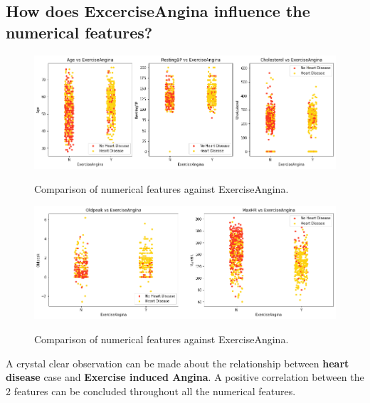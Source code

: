 \subsection{How does ExcerciseAngina influence the numerical features?}
\begin{figure}[!htpb]
    \centering
    \includegraphics[width=0.7\linewidth]{Figures/Outputs/exer-ang.png}
    \label{Comparison between numerical features against ExerciseAngina}
    \caption{Comparison of numerical features against ExerciseAngina.}
\end{figure}
\begin{figure}[!htpb]
    \centering
    \includegraphics[width=0.7\linewidth]{Figures/Outputs/exer-ang2.png}
    \label{Comparison between numerical features against ExerciseAngina}
    \caption{Comparison of numerical features against ExerciseAngina.}
\end{figure}
A crystal clear observation can be made about the relationship between \textbf{heart disease} case and \textbf{Exercise induced Angina}. A positive correlation between the 2 features can be concluded throughout all the numerical features. 
\newpage
